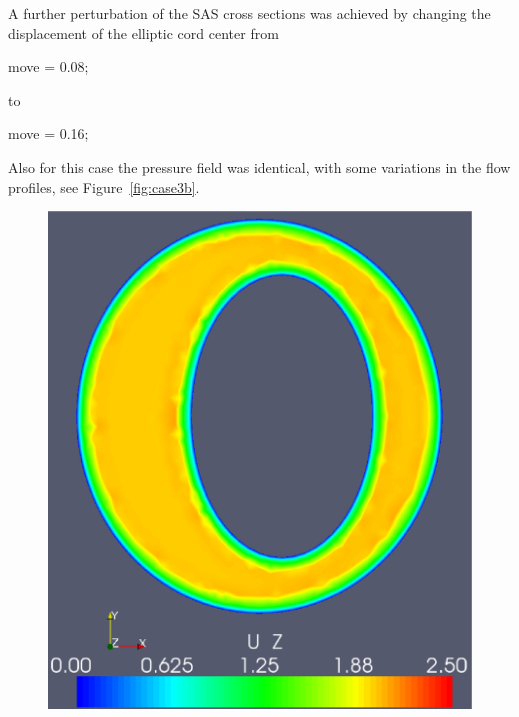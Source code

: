 A further perturbation of the SAS cross sections was achieved by
changing the displacement of the elliptic cord center from
\begin{anycode}
move = 0.08;
\end{anycode}
to
\begin{anycode}
move = 0.16;
\end{anycode}
Also for this case the pressure field was identical, with some
variations in the flow profiles, see Figure~\ref{fig:case3b}.

\begin{figure}
\bwfig
          {\includegraphics[width=\threefigsfull]{chapters/hentschel/pdf/pulse_f1_08_elliptic_sysmax_nmb7.pdf}
}
\end{figure}
